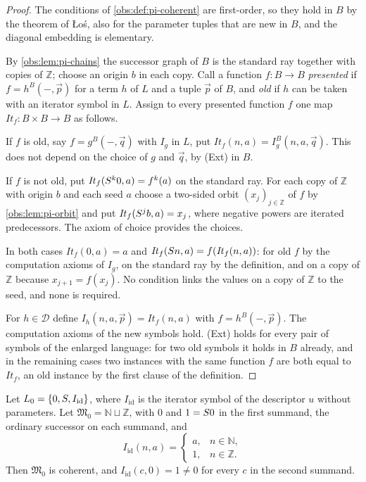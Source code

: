 \begin{proof}
The conditions of \cref{obs:def:pi-coherent} are first-order, so they hold in
$B$ by the theorem of \L o\'s, also for the parameter tuples that are new in
$B$, and the diagonal embedding is elementary.

By \cref{obs:lem:pi-chains} the successor graph of $B$ is the standard ray
together with copies of $\mathbb{Z}$; choose an origin $b$ in each copy. Call a
function $f\colon B\to B$ \emph{presented} if $f=h^{B}(-,\vec p)$ for a term
$h$ of $L$ and a tuple $\vec p$ of $B$, and \emph{old} if $h$ can be taken with
an iterator symbol in $L$. Assign to every presented function $f$ one map
$\mathit{It}_f\colon B\times B\to B$ as follows.

If $f$ is old, say $f=g^{B}(-,\vec q)$ with $I_g$ in $L$, put
$\mathit{It}_f(n,a)=I_g^{B}(n,a,\vec q)$. This does not depend on the choice of
$g$ and $\vec q$, by (Ext) in $B$.

If $f$ is not old, put $\mathit{It}_f(S^{k}0,a)=f^{k}(a)$ on the standard
ray. For each copy of $\mathbb{Z}$ with origin $b$ and each seed $a$ choose a
two-sided orbit $(x_j)_{j\in\mathbb{Z}}$ of $f$ by \cref{obs:lem:pi-orbit} and
put $\mathit{It}_f(S^{j}b,a)=x_j$, where negative powers are iterated
predecessors. The axiom of choice provides the choices.

In both cases $\mathit{It}_f(0,a)=a$ and
$\mathit{It}_f(S n,a)=f(\mathit{It}_f(n,a))$: for old $f$ by the computation
axioms of $I_g$, on the standard ray by the definition, and on a copy of
$\mathbb{Z}$ because $x_{j+1}=f(x_j)$. No condition links the values on a copy
of $\mathbb{Z}$ to the seed, and none is required.

For $h\in\mathcal{D}$ define
$I_h(n,a,\vec p)=\mathit{It}_f(n,a)$ with $f=h^{B}(-,\vec p)$. The computation
axioms of the new symbols hold. (Ext) holds for every pair of symbols of the
enlarged language: for two old symbols it holds in $B$ already, and in the
remaining cases two instances with the same function $f$ are both equal to
$\mathit{It}_f$, an old instance by the first clause of the definition.
\end{proof}

\begin{lemma}
\label{obs:lem:pi-seed}
Let $L_0=\{0,S,I_{\mathrm{id}}\}$, where $I_{\mathrm{id}}$ is the iterator
symbol of the descriptor $u$ without parameters. Let
$\mathfrak{M}_0=\mathbb{N}\sqcup\mathbb{Z}$, with $0$ and $1=S 0$ in the
first summand, the ordinary successor on each summand, and
\[
I_{\mathrm{id}}(n,a)=
\begin{cases}
a, & n\in\mathbb{N},\\
1, & n\in\mathbb{Z}.
\end{cases}
\]
Then $\mathfrak{M}_0$ is coherent, and
$I_{\mathrm{id}}(c,0)=1\ne 0$ for every $c$ in the second summand.
\end{lemma}

